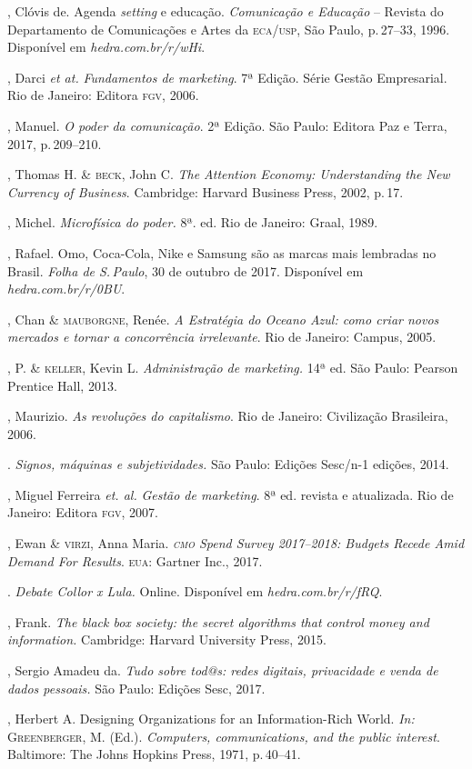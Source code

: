 \begin{bibliohedra}

, Clóvis de. Agenda \textit{setting} e educação.
\textit{Comunicação e Educação} -- Revista do Departamento de Comunicações e
Artes da \textsc{eca}/\textsc{usp}, São Paulo, p.\,27--33, 1996. Disponível em \textit{hedra.com.br/r/wHi}.

, Darci \textit{et at.} \textit{Fundamentos de marketing}. 7ª Edição. Série Gestão Empresarial. Rio de Janeiro: Editora \textsc{fgv}, 2006.

, Manuel. \textit{O poder da comunicação}. 2ª
Edição. São Paulo: Editora Paz e Terra, 2017, p.\,209--210.

, Thomas H. \& \textsc{beck}, John C. \textit{The Attention Economy:
Understanding the New Currency of Business}. Cambridge: Harvard Business
Press, 2002, p.\,17.

, Michel. \textit{Microfísica do poder.} 8ª. ed. Rio de
Janeiro: Graal, 1989.

, Rafael. Omo, Coca-Cola, Nike e Samsung são as marcas
mais lembradas no Brasil. \textit{Folha de S.\,Paulo}, 30 de outubro de 2017.
Disponível em \textit{hedra.com.br/r/0BU}.

, Chan \& \textsc{mauborgne}, Renée. \textit{A Estratégia do Oceano Azul:
como criar novos mercados e tornar a concorrência irrelevante}. Rio de
Janeiro: Campus, 2005.

, P. \& \textsc{keller}, Kevin L. \textit{Administração de marketing.} 14ª
ed. São Paulo: Pearson Prentice Hall, 2013.

, Maurizio. \textit{As revoluções do capitalismo}. Rio de Janeiro: Civilização Brasileira, 2006.

\titidem. \textit{Signos, máquinas e subjetividades.} São
Paulo: Edições Sesc/n-1 edições, 2014.

, Miguel Ferreira \textit{et. al.} \textit{Gestão de marketing}. 8ª ed. revista e atualizada. Rio de Janeiro: Editora \textsc{fgv}, 2007.

, Ewan \& \textsc{virzi}, Anna Maria. \textit{\textsc{cmo} Spend Survey 2017--2018: Budgets Recede Amid Demand For Results}. \textsc{eua}: Gartner Inc., 2017.

. \textit{Debate Collor x Lula.} Online. Disponível em \textit{hedra.com.br/r/fRQ}.

, Frank. \textit{The black box society: the secret algorithms
that control money and information.} Cambridge: Harvard University Press, 2015.

, Sergio Amadeu da. \textit{Tudo sobre tod@s: redes digitais,
privacidade e venda de dados pessoais.} São Paulo: Edições Sesc, 2017.

, Herbert A. Designing Organizations for an
Information-Rich World. \textit{In:} \textsc{Greenberger}, M. (Ed.). \textit{Computers,
communications, and the public interest}. Baltimore: The Johns Hopkins Press, 1971,
p.\,40--41.

\end{bibliohedra}



